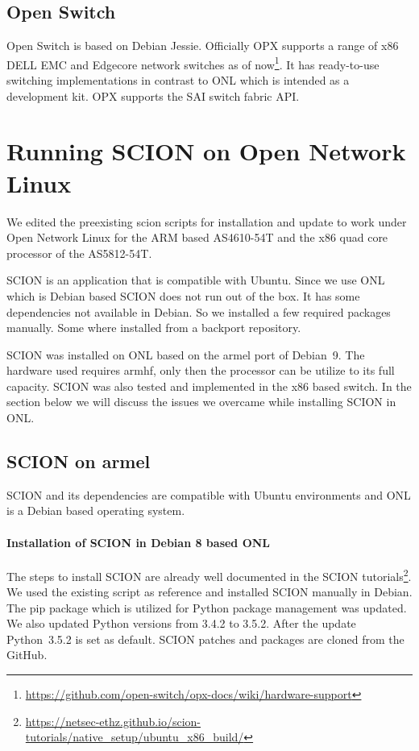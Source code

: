 \documentclass[a4paper]{article}
\begin{document}
\subsection{Open Switch}
Open Switch is based on Debian Jessie. Officially OPX supports a range of x86 DELL EMC and Edgecore network switches as of now\footnote{\url{https://github.com/open-switch/opx-docs/wiki/hardware-support}}. It has ready-to-use switching implementations in contrast to ONL which is intended as a development kit. OPX supports the SAI switch fabric API.

\section{Running SCION on Open Network Linux}
We edited the preexisting scion scripts for installation and update to work under Open Network Linux for the ARM based AS4610-54T and the x86 quad core processor of the AS5812-54T.

SCION is an application that is compatible with Ubuntu. Since we use ONL which is Debian based SCION does not run out of the box. It has some dependencies not available in Debian. So we installed a few required packages manually. Some where installed from a backport repository.

SCION was installed on ONL based on the armel port of Debian~9. The hardware used requires armhf, only then the processor can be utilize to its full capacity. SCION was also tested and implemented in the x86 based switch. In the section below we will discuss the issues we overcame while installing SCION in ONL.

\subsection{SCION on armel}
SCION and its dependencies are compatible with Ubuntu environments and ONL is a Debian based operating system.

\paragraph{Installation of SCION in Debian 8 based ONL}
The steps to install SCION are already well documented in the SCION tutorials\footnote{\url{https://netsec-ethz.github.io/scion-tutorials/native_setup/ubuntu_x86_build/}}. We used the existing script as reference and installed SCION manually in Debian. The pip package which is utilized for Python package management was updated. We also updated Python versions from 3.4.2 to 3.5.2. After the update Python~3.5.2 is set as default. SCION patches and packages are cloned from the GitHub.
\end{document}
